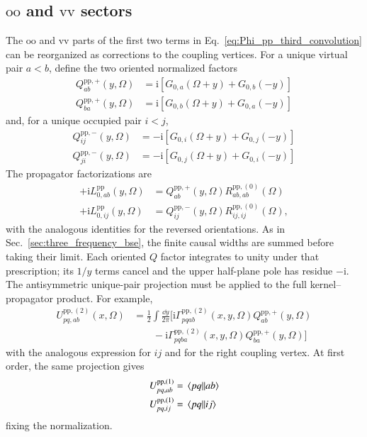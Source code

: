\documentclass[aip,jcp,reprint,noshowkeys,superscriptaddress]{revtex4-1}
\newcommand{\ii}{\mathrm{i}}
\newcommand{\pp}{\text{pp}}
\begin{document}
\subsection{$\text{oo}$ and $\text{vv}$ sectors}

The $\text{oo}$ and $\text{vv}$ parts of the first two terms in
Eq.~\eqref{eq:Phi_pp_third_convolution} can be reorganized as corrections to
the coupling vertices.
For a unique virtual pair $a<b$, define the two oriented normalized factors
\begin{align}
    Q_{ab}^{\pp,+}(y,\Omega)
    &=
    \ii\left[G_{0,a}(\Omega+y)+G_{0,b}(-y)\right]
    \\
    Q_{ba}^{\pp,+}(y,\Omega)
    &=
    \ii\left[G_{0,b}(\Omega+y)+G_{0,a}(-y)\right]
    \label{eq:Q_pp_plus_orientations}
\end{align}
and, for a unique occupied pair $i<j$,
\begin{align}
    Q_{ij}^{\pp,-}(y,\Omega)
    &=
    -\ii\left[G_{0,i}(\Omega+y)+G_{0,j}(-y)\right]
    \\
    Q_{ji}^{\pp,-}(y,\Omega)
    &=
    -\ii\left[G_{0,j}(\Omega+y)+G_{0,i}(-y)\right]
    \label{eq:Q_pp_minus_orientations}
\end{align}
The propagator factorizations are
\begin{align}
    +\ii L_{0,ab}^{\pp}(y,\Omega)
    &=Q_{ab}^{\pp,+}(y,\Omega)R_{ab,ab}^{\pp,(0)}(\Omega)
    \\
    +\ii L_{0,ij}^{\pp}(y,\Omega)
    &=Q_{ij}^{\pp,-}(y,\Omega)R_{ij,ij}^{\pp,(0)}(\Omega),
    \label{eq:pp_oriented_factorization}
\end{align}
with the analogous identities for the reversed orientations.
As in Sec.~\ref{sec:three_frequency_bse}, the finite causal widths are
summed before taking their limit. Each oriented $Q$ factor integrates to
unity under that prescription; its $1/y$ terms cancel and the upper
half-plane pole has residue $-\ii$.
The antisymmetric unique-pair projection must be applied to the full
kernel--propagator product.  For example,
\begin{equation}
\begin{split}
    U_{pq,ab}^{\pp,(2)}(x,\Omega)
    &=
    \frac12\int\frac{\dd{y}}{2\pi}
    \Big[
    \ii\Gamma_{pqab}^{\pp,(2)}(x,y,\Omega)
    Q_{ab}^{\pp,+}(y,\Omega)
    \\
    &\qquad-
    \ii\Gamma_{pqba}^{\pp,(2)}(x,y,\Omega)
    Q_{ba}^{\pp,+}(y,\Omega)
    \Big]
\end{split}
\label{eq:U_pp_second_projection_ab}
\end{equation}
with the analogous expression for $ij$ and for the right coupling vertex.
At first order, the same projection gives
\begin{align}
	U_{pq,ab}^{\pp,(1)} & = \mel{pq}{}{ab} 
	\\
	U_{pq,ij}^{\pp,(1)} & = \mel{pq}{}{ij}
\end{align}
fixing the normalization.
\end{document}
